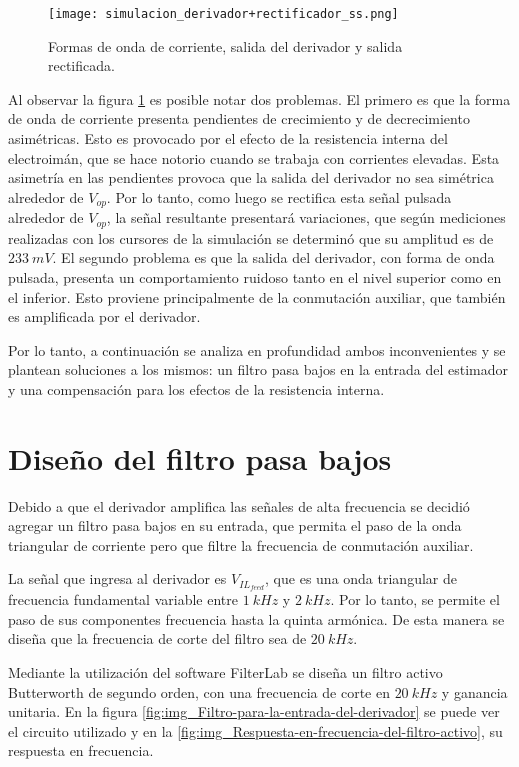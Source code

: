 \begin{figure}[H]
	\centering
	\texttt{[image: simulacion\_derivador+rectificador\_ss.png]}
	\caption{Formas de onda de corriente, salida del derivador y salida rectificada.}
	\label{fig:img_simulacion_derivador+rectificador_ss}
\end{figure}

Al observar la figura \ref{fig:img_simulacion_derivador+rectificador_ss} es posible notar dos problemas. El primero es que la forma de onda de corriente presenta pendientes de crecimiento y de decrecimiento asimétricas. Esto es provocado por el efecto de la resistencia interna del electroimán, que se hace notorio cuando se trabaja con corrientes elevadas. Esta asimetría en las pendientes provoca que la salida del derivador no sea simétrica alrededor de $V_{op}$. Por lo tanto, como luego se rectifica esta señal pulsada alrededor de $V_{op}$, la señal resultante presentará variaciones, que según mediciones realizadas con los cursores de la simulación se determinó que su amplitud es de $233\:mV$. El segundo problema es que la salida del derivador, con forma de onda pulsada, presenta un comportamiento ruidoso tanto en el nivel superior como en el inferior. Esto proviene principalmente de la conmutación auxiliar, que también es amplificada por el derivador. 

Por lo tanto, a continuación se analiza en profundidad ambos inconvenientes y se plantean soluciones a los mismos: un filtro pasa bajos en la entrada del estimador y una compensación para los efectos de la resistencia interna.

\section{Diseño del filtro pasa bajos}

Debido a que el derivador amplifica las señales de alta frecuencia se decidió agregar un filtro pasa bajos en su entrada, que permita el paso de la onda triangular de corriente pero que filtre la frecuencia de conmutación auxiliar. 

La señal que ingresa al derivador es $V_{IL_{feed}}$, que es una onda triangular de frecuencia fundamental variable entre $1\:kHz$ y $2\:kHz$. Por lo tanto, se permite el paso de sus componentes frecuencia hasta la quinta armónica. De esta manera se diseña que la frecuencia de corte del filtro sea de $20\:kHz$.

Mediante la utilización del software FilterLab se diseña un filtro activo Butterworth de segundo orden, con una frecuencia de corte en $20\:kHz$ y ganancia unitaria. En la figura  \ref{fig:img_Filtro-para-la-entrada-del-derivador} se puede ver el circuito utilizado y en la \ref{fig:img_Respuesta-en-frecuencia-del-filtro-activo}, su respuesta en frecuencia.

